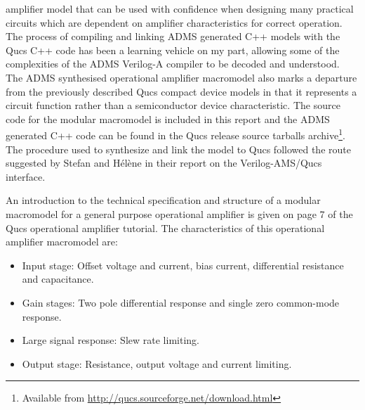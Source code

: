 amplifier model that can be used with confidence when designing many
practical circuits which are dependent on amplifier characteristics
for correct operation. The process of compiling and linking ADMS
generated C++ models with the Qucs C++ code has been a learning
vehicle on my part, allowing some of the complexities of the ADMS
Verilog-A compiler to be decoded and understood.  The ADMS synthesised
operational amplifier macromodel also marks a departure from the
previously described Qucs compact device models in that it represents
a circuit function rather than a semiconductor device characteristic.
The source code for the modular macromodel is included in this report
and the ADMS generated C++ code can be found in the Qucs release
source tarballs archive\footnote{Available from
\url{http://qucs.sourceforge.net/download.html}}. The procedure used to
synthesize and link the model to Qucs followed the route suggested by
Stefan and H\'{e}l\`{e}ne in their report on the Verilog-AMS/Qucs
interface.



An introduction to the technical specification and structure of a
modular macromodel for a general purpose operational amplifier is given
on page 7 of the Qucs operational amplifier tutorial. The
characteristics of this operational amplifier macromodel are:

\begin{itemize}
 \item Input stage: Offset voltage and current, bias current, differential resistance and capacitance.
 \item Gain stages: Two pole differential response and single zero common-mode response.
 \item Large signal response: Slew rate limiting.
 \item Output stage: Resistance, output voltage and current limiting.
\end{itemize}


